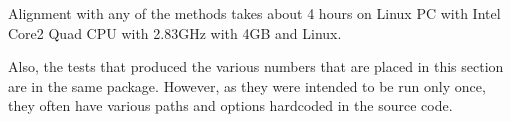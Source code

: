 Alignment with any of the methods takes about 4 hours on Linux PC with Intel Core2 Quad CPU with 2.83GHz with 4GB and Linux.

Also, the tests that produced the various numbers that are placed in this section are in the same package. However, as they were intended to be run only once, they often have various paths and options hardcoded in the source code.
